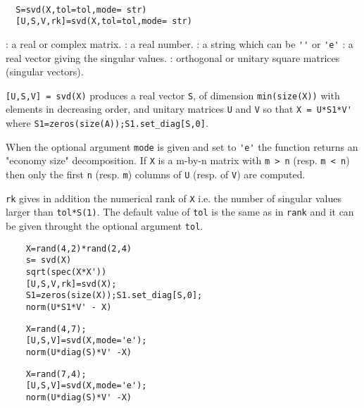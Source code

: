 \begin{mandesc}
   \\ %
\end{mandesc}
\begin{calling_sequence}
\begin{verbatim}
  S=svd(X,tol=tol,mode= str)  
  [U,S,V,rk]=svd(X,tol=tol,mode= str)  
\end{verbatim}
\end{calling_sequence}
\begin{parameters}
  \begin{varlist}
    : a real or complex matrix.
    : a real number.
    : a string which can be \verb!''! or \verb!'e'!
    : a real vector giving the singular values.
    : orthogonal or unitary square matrices (singular vectors).
  \end{varlist}
\end{parameters}
\begin{mandescription}
  \verb![U,S,V] = svd(X)! produces a real vector \verb!S!, of dimension 
  \verb!min(size(X))! with elements in decreasing order, and unitary matrices
  \verb!U! and \verb!V! so that \verb!X = U*S1*V'! where 
  \verb!S1=zeros(size(A));S1.set_diag[S,0]!. 
  
  When the optional argument \verb!mode! is given and set to \verb!'e'! 
  the function returns an "economy size" decomposition. 
  If \verb!X! is a m-by-n matrix with \verb!m > n! (resp. \verb!m < n!) 
  then only the first \verb!n! (resp. \verb!m!) 
  columns of \verb!U! (resp. of \verb!V!) are computed. 

  \verb!rk! gives in addition the numerical rank of \verb!X! i.e. the number of
  singular values larger than \verb!tol*S(1)!. The default value of \verb!tol!  is
  the same as in \verb!rank! and it can be given throught the optional argument
  \verb!tol!.
\end{mandescription}
\begin{examples}
  \begin{Verbatim}
    X=rand(4,2)*rand(2,4)
    s= svd(X)
    sqrt(spec(X*X'))
    [U,S,V,rk]=svd(X);
    S1=zeros(size(X));S1.set_diag[S,0];
    norm(U*S1*V' - X)
  \end{Verbatim}
  \begin{Verbatim}
    X=rand(4,7);
    [U,S,V]=svd(X,mode='e');
    norm(U*diag(S)*V' -X) 
  \end{Verbatim}
  \begin{Verbatim}
    X=rand(7,4);
    [U,S,V]=svd(X,mode='e');
    norm(U*diag(S)*V' -X) 
  \end{Verbatim}
\end{examples}
\begin{manseealso}
         
\end{manseealso}

